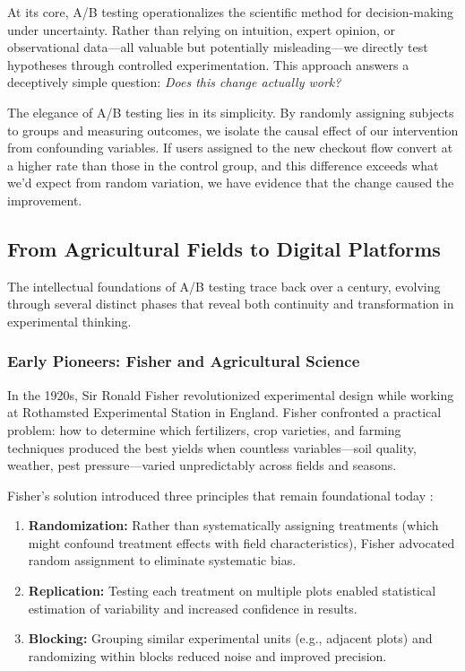 At its core, A/B testing operationalizes the scientific method for decision-making under uncertainty. Rather than relying on intuition, expert opinion, or observational data—all valuable but potentially misleading—we directly test hypotheses through controlled experimentation. This approach answers a deceptively simple question: \textit{Does this change actually work?}

The elegance of A/B testing lies in its simplicity. By randomly assigning subjects to groups and measuring outcomes, we isolate the causal effect of our intervention from confounding variables. If users assigned to the new checkout flow convert at a higher rate than those in the control group, and this difference exceeds what we'd expect from random variation, we have evidence that the change caused the improvement.

\subsection{From Agricultural Fields to Digital Platforms}

The intellectual foundations of A/B testing trace back over a century, evolving through several distinct phases that reveal both continuity and transformation in experimental thinking.

\subsubsection{Early Pioneers: Fisher and Agricultural Science}

In the 1920s, Sir Ronald Fisher revolutionized experimental design while working at Rothamsted Experimental Station in England. Fisher confronted a practical problem: how to determine which fertilizers, crop varieties, and farming techniques produced the best yields when countless variables—soil quality, weather, pest pressure—varied unpredictably across fields and seasons.

Fisher's solution introduced three principles that remain foundational today \citep{fisher1935design}:

\begin{enumerate}
    \item \textbf{Randomization:} Rather than systematically assigning treatments (which might confound treatment effects with field characteristics), Fisher advocated random assignment to eliminate systematic bias.

    \item \textbf{Replication:} Testing each treatment on multiple plots enabled statistical estimation of variability and increased confidence in results.

    \item \textbf{Blocking:} Grouping similar experimental units (e.g., adjacent plots) and randomizing within blocks reduced noise and improved precision.
\end{enumerate}

